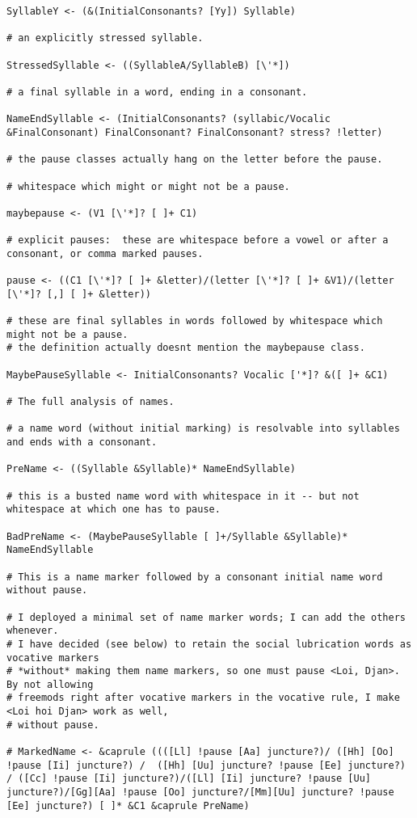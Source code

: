 \documentclass[12pt]{book}
\begin{document}
{\begin{verbatim}
SyllableY <- (&(InitialConsonants? [Yy]) Syllable)

# an explicitly stressed syllable.

StressedSyllable <- ((SyllableA/SyllableB) [\'*])

# a final syllable in a word, ending in a consonant.

NameEndSyllable <- (InitialConsonants? (syllabic/Vocalic &FinalConsonant) FinalConsonant? FinalConsonant? stress? !letter)

# the pause classes actually hang on the letter before the pause.

# whitespace which might or might not be a pause.

maybepause <- (V1 [\'*]? [ ]+ C1)

# explicit pauses:  these are whitespace before a vowel or after a consonant, or comma marked pauses.

pause <- ((C1 [\'*]? [ ]+ &letter)/(letter [\'*]? [ ]+ &V1)/(letter [\'*]? [,] [ ]+ &letter))

# these are final syllables in words followed by whitespace which might not be a pause.
# the definition actually doesnt mention the maybepause class.

MaybePauseSyllable <- InitialConsonants? Vocalic ['*]? &([ ]+ &C1)

# The full analysis of names.

# a name word (without initial marking) is resolvable into syllables and ends with a consonant.

PreName <- ((Syllable &Syllable)* NameEndSyllable)

# this is a busted name word with whitespace in it -- but not whitespace at which one has to pause.

BadPreName <- (MaybePauseSyllable [ ]+/Syllable &Syllable)* NameEndSyllable

# This is a name marker followed by a consonant initial name word without pause.

# I deployed a minimal set of name marker words; I can add the others whenever.
# I have decided (see below) to retain the social lubrication words as vocative markers
# *without* making them name markers, so one must pause <Loi, Djan>.  By not allowing
# freemods right after vocative markers in the vocative rule, I make <Loi hoi Djan> work as well,
# without pause.

# MarkedName <- &caprule ((([Ll] !pause [Aa] juncture?)/ ([Hh] [Oo] !pause [Ii] juncture?) /  ([Hh] [Uu] juncture? !pause [Ee] juncture?) / ([Cc] !pause [Ii] juncture?)/([Ll] [Ii] juncture? !pause [Uu] juncture?)/[Gg][Aa] !pause [Oo] juncture?/[Mm][Uu] juncture? !pause [Ee] juncture?) [ ]* &C1 &caprule PreName)


\end{verbatim}}
\end{document}
